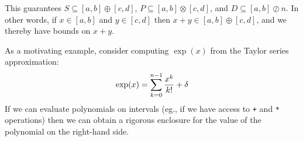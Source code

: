 This guarantees $S \ensuremath{\subseteq} [a,b] \ensuremath{\oplus} [c,d]$, $P \ensuremath{\subseteq} [a,b] \ensuremath{\otimes} [c,d]$, and $D \ensuremath{\subseteq} [a,b] \ensuremath{\oslash} n$. In other words, if $x \ensuremath{\in} [a,b]$ and $y \ensuremath{\in} [c,d]$ then $x +y \ensuremath{\in} [a,b] \ensuremath{\oplus} [c,d]$, and we thereby have  bounds on $x + y$.

\begin{example}[exponential] As a motivating example, consider computing $\exp(x)$ from the Taylor series approximation:
\[
\exp(x) = \sum_{k=0}^{n-1} {x^k \over k!} + \ensuremath{\delta}
\]
If we can evaluate polynomials on intervals (eg., if we have access to \texttt{+} and \texttt{*} operations) then we can obtain a rigorous enclosure for the value of the polynomial on the right-hand side.  \end{example}



